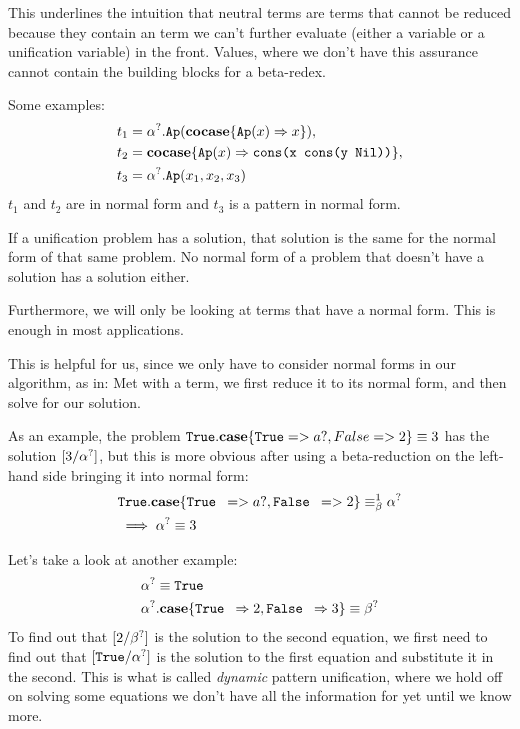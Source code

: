 \documentclass[twoside,12pt,a4paper]{article}
\begin{document}
This underlines the intuition that neutral terms are terms that cannot be reduced because
they contain an term we can't further evaluate (either a variable or a unification variable) in the front.
Values, where we don't have this assurance cannot contain the building blocks for a beta-redex.

Some examples: 
\begin{align*}
    \begin{split}
        t_1 &= \alpha^?.\texttt{Ap}(\textbf{cocase}\{\texttt{Ap}(x)\Rightarrow x\}), \\
        t_2 &= \textbf{cocase}\{\texttt{Ap}(x)\Rightarrow \texttt{cons(x cons(y Nil))}\},   \\
        t_3 &= \alpha^?.\texttt{Ap}(x_1, x_2, x_3)
    \end{split}    
\end{align*}
$t_1$ and $t_2$ are in normal form and $t_3$ is a pattern in normal form.

\begin{theorem}
    If a unification problem has a solution, that solution is the same for the normal form of that same problem. 
    No normal form of a problem that doesn't have a solution has a solution either.
\end{theorem}

Furthermore, we will only be looking at terms that have a normal form. This is enough in most applications. %

This is helpful for us, since we only have to consider normal forms in our algorithm, as in: 
Met with a term, we first reduce it to its normal form, and then solve for our solution.

As an example, the problem $\texttt{True}.\textbf{case} \{ \texttt{True} => a?, False => 2 \} \equiv 3 $ has the solution $[3/\alpha^?]$, 
but this is more obvious after using a beta-reduction on the left-hand side bringing it into normal form:
\begin{align*}
    &\texttt{True}.\textbf{case} \{ \texttt{True } => a?, \texttt{False } => 2 \} \equiv_{\beta}^1 \alpha^?  \\
    &\implies \alpha^? \equiv 3   
\end{align*}

Let's take a look at another example:
\begin{align*}
    &\alpha^? \equiv \texttt{True } \\
    &\alpha^?.\textbf{case}\{\texttt{True } \Rightarrow 2, \texttt{False } \Rightarrow 3\} \equiv \beta^?
\end{align*}
To find out that $[2/\beta^?]$ is the solution to the second equation, we first need to find out that
$[\texttt{True}/\alpha^?]$ is the solution to the first equation and substitute it in the second.
This is what is called \textit{dynamic} pattern unification, where we hold off on solving some equations we don't have all the information for yet until we know more. 
\end{document}
